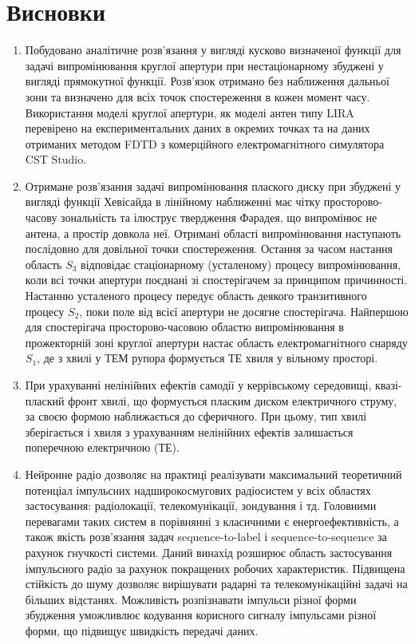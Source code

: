 \chapter*{Висновки}

\begin{enumerate}

\item Побудовано аналітичне розв'язання у вигляді кусково визначеної функції для 
задачі випромінювання круглої апертури при нестаціонарному збуджені у вигляді 
прямокутної функції. Розв'язок отримано без наближення дальньої зони та визначено 
для всіх точок спостереження в кожен момент часу. Використання моделі круглої 
апертури, як моделі антен типу LIRA перевірено на експериментальних даних в 
окремих точках та на даних отриманих методом FDTD з комерційного електромагнітного 
симулятора CST Studio.

\item Отримане розв'язання задачі випромінювання плаского диску при збуджені у 
вигляді функції Хевісайда в лінійному наближенні має чітку просторово-часову 
зональність та ілюструє твердження Фарадея, що випромінює не антена, а простір 
довкола неї. Отримані області випромінювання наступають послідовно для довільної 
точки спостереження. Остання за часом настання область $ S_3 $ відповідає 
стаціонарному (усталеному) процесу випромінювання, коли всі точки апертури 
поєднані зі спостерігачем за принципом причинності. Настанню усталеного процесу 
передує область деякого транзитивного процесу $ S_2 $, поки поле від всієї 
апертури не досягне спостерігача. Найпершою для спостерігача просторово-часовою 
областю випромінювання в прожекторній зоні круглої апертури настає область 
електромагнітного снаряду $ S_1 $, де з хвилі у ТЕМ рупора формується ТЕ хвиля 
у вільному просторі.

\item При урахуванні нелінійних ефектів самодії у керрівському середовищі, 
квазі-плаский фронт хвилі, що формується пласким диском електричного струму, 
за своєю формою наближається до сферичного. При цьому, тип хвилі зберігається і
хвиля з урахуванням нелінійних ефектів залишається поперечною електричною (ТЕ). 

\item Нейронне радіо дозволяє на практиці реалізувати максимальний теоретичний
потенціал імпульсних надширокосмугових радіосистем у всіх областях застосування:
радіолокації, телекомунікації, зондування і тд. Головними перевагами таких систем 
в порівнянні з класичними є енергоефективність, а також якість розв'язання задач 
sequence-to-label і sequence-to-sequence за рахунок гнучкості системи.
Даний винахід розширює область застосування імпульсного радіо за 
рахунок покращених робочих характеристик. Підвищена стійкість до 
шуму дозволяє вирішувати радарні та телекомунікаційні задачі на 
більших відстанях. Можливість розпізнавати імпульси різної форми 
збудження уможливлює кодування корисного сигналу імпульсами різної форми, 
що підвищує швидкість передачі даних. 

\end{enumerate}
